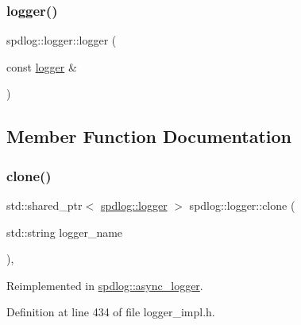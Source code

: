 \subsubsection{\texorpdfstring{logger()}{logger()}\hspace{0.1cm}{\footnotesize\ttfamily [4/4]}}
{\footnotesize\ttfamily spdlog\+::logger\+::logger (\begin{DoxyParamCaption}\item[{const \hyperlink{classspdlog_1_1logger}{logger} \&}]{ }\end{DoxyParamCaption})\hspace{0.3cm}{\ttfamily [delete]}}



\subsection{Member Function Documentation}
\mbox{\label{classspdlog_1_1logger_a649a3c1a1b380e2488a93f9c3ae694de}} 
\subsubsection{\texorpdfstring{clone()}{clone()}}
{\footnotesize\ttfamily std\+::shared\+\_\+ptr$<$ \hyperlink{classspdlog_1_1logger}{spdlog\+::logger} $>$ spdlog\+::logger\+::clone (\begin{DoxyParamCaption}\item[{std\+::string}]{logger\+\_\+name }\end{DoxyParamCaption})\hspace{0.3cm}{\ttfamily [inline]}, {\ttfamily [virtual]}}



Reimplemented in \hyperlink{classspdlog_1_1async__logger_aef60bc96b78ff98a471dc08977d4cb5c}{spdlog\+::async\+\_\+logger}.



Definition at line 434 of file logger\+\_\+impl.\+h.

